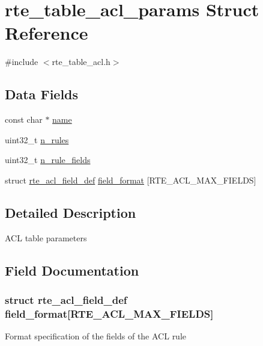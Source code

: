 \hypertarget{structrte__table__acl__params}{}\section{rte\+\_\+table\+\_\+acl\+\_\+params Struct Reference}
\label{structrte__table__acl__params}


{\ttfamily \#include $<$rte\+\_\+table\+\_\+acl.\+h$>$}

\subsection*{Data Fields}
\begin{DoxyCompactItemize}
\item 
const char $\ast$ \hyperlink{structrte__table__acl__params_a8f8f80d37794cde9472343e4487ba3eb}{name}
\item 
uint32\+\_\+t \hyperlink{structrte__table__acl__params_a36f832c0360005ce685ffab87c3e188a}{n\+\_\+rules}
\item 
uint32\+\_\+t \hyperlink{structrte__table__acl__params_ab640a2a844808a4b7fbe56dfc12c665c}{n\+\_\+rule\+\_\+fields}
\item 
struct \hyperlink{structrte__acl__field__def}{rte\+\_\+acl\+\_\+field\+\_\+def} \hyperlink{structrte__table__acl__params_a715458ced092daff109be5ed0504c374}{field\+\_\+format} \mbox{[}R\+T\+E\+\_\+\+A\+C\+L\+\_\+\+M\+A\+X\+\_\+\+F\+I\+E\+L\+D\+S\mbox{]}
\end{DoxyCompactItemize}


\subsection{Detailed Description}
A\+C\+L table parameters 

\subsection{Field Documentation}
\hypertarget{structrte__table__acl__params_a715458ced092daff109be5ed0504c374}{}
\subsubsection[{field\+\_\+format}]{\setlength{\rightskip}{0pt plus 5cm}struct {\bf rte\+\_\+acl\+\_\+field\+\_\+def} field\+\_\+format\mbox{[}R\+T\+E\+\_\+\+A\+C\+L\+\_\+\+M\+A\+X\+\_\+\+F\+I\+E\+L\+D\+S\mbox{]}}\label{structrte__table__acl__params_a715458ced092daff109be5ed0504c374}
Format specification of the fields of the A\+C\+L rule \hypertarget{structrte__table__acl__params_ab640a2a844808a4b7fbe56dfc12c665c}{}
